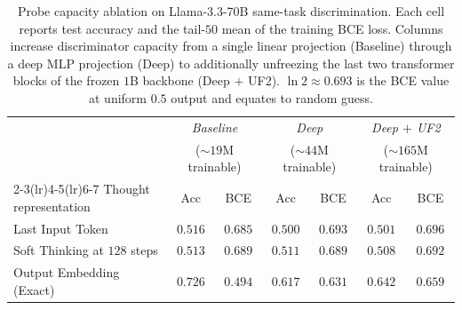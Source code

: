 
\begin{table}[!htbp]
  \caption{Probe capacity ablation on Llama-3.3-70B same-task discrimination. Each cell reports test accuracy and the tail-$50$ mean of the training BCE loss. Columns increase discriminator capacity from a single linear projection (Baseline) through a deep MLP projection (Deep) to additionally unfreezing the last two transformer blocks of the frozen $1$B backbone (Deep $+$ UF2). $\ln 2 \approx 0.693$ is the BCE value at uniform $0.5$ output and equates to random guess.}
  \label{tab:disc-capacity-ablation-70b}
  \centering
  \footnotesize
  \setlength{\tabcolsep}{6pt}
  \renewcommand{\arraystretch}{1.15}
  \begin{tabular}{@{}l cc cc cc@{}}
    \toprule
                              & \multicolumn{2}{c}{\textit{Baseline}} & \multicolumn{2}{c}{\textit{Deep}} & \multicolumn{2}{c}{\textit{Deep $+$ UF2}} \\
                              & \multicolumn{2}{c}{($\sim 19$M trainable)} & \multicolumn{2}{c}{($\sim 44$M trainable)} & \multicolumn{2}{c}{($\sim 165$M trainable)} \\
    \cmidrule(lr){2-3}\cmidrule(lr){4-5}\cmidrule(lr){6-7}
    Thought representation        & Acc & BCE & Acc & BCE & Acc & BCE \\
    \midrule
    Last Input Token              & $0.516$ & $0.685$ & $0.500$ & $0.693$ & $0.501$ & $0.696$ \\
    Soft Thinking at $128$ steps  & $0.513$ & $0.689$ & $0.511$ & $0.689$ & $0.508$ & $0.692$ \\
    Output Embedding (Exact)      & $0.726$ & $0.494$ & $0.617$ & $0.631$ & $0.642$ & $0.659$ \\
    \bottomrule
  \end{tabular}
\end{table}
